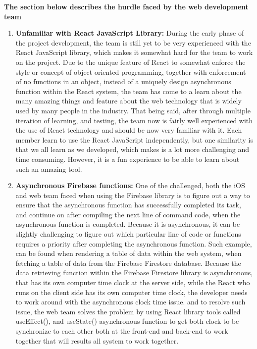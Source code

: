 \documentclass[onecolumn, draftclsnofoot,10pt, compsoc]{IEEEtran}
\begin{document}
\begin{flushleft}
\textbf{The section below describes the hurdle faced by the web development team}

\begin{enumerate}

 \item \textbf{Unfamiliar with React JavaScript Library:}\newline
 During the early phase of the project development, the team is still yet to be very experienced with the React JavaScript library, which makes it somewhat hard for the team to work on the project. Due to the unique feature of React to somewhat enforce the style or concept of object oriented programming, together with enforcement of no functions in an object, instead of a uniquely design asynchronous function within the React system, the team has come to a learn about the many amazing things and feature about the web technology that is widely used by many people in the industry. That being said, after through multiple iteration of learning, and testing, the team now is fairly well experienced with the use of React technology and should be now very familiar with it. Each member learn to use the  React JavaScript independently, but one similarity is that we all learn as we developed, which makes is a lot more challenging and time consuming. However, it is a fun experience to be able to learn about such an amazing tool. \newline
 
 \item \textbf{Asynchronous Firebase functions: }
 One of the challenged, both the iOS and web team faced when using the Firebase library is to figure out a way to ensure that the asynchronous function has successfully completed its task, and continue on after compiling the next line of command code, when the asynchronous function is completed. Because it is asynchronous, it can be slightly challenging to figure out which particular line of code or functions requires a priority after completing the asynchronous function. Such example, can be found when rendering a table of data within the web system, when fetching a table of data from the Firebase Firestore database. Because the data retrieving function within the Firebase Firestore library is asynchronous, that has its own computer time clock at the server side, while the React who runs on the client side has its own computer time clock, the developer needs to work around with the asynchronous clock time issue. and to resolve such issue, the web team solves the problem by using React library tools called useEffect(), and useState() asynchronous function to get both clock to be synchronize to each other both at the front-end and back-end to work together that will results all system to work together. \newline
 

\end{enumerate}
\end{flushleft}
\end{document}

